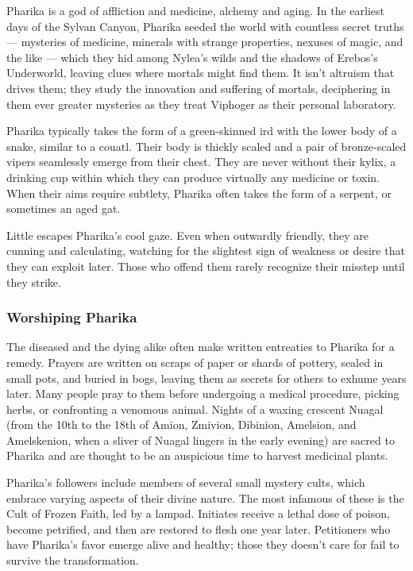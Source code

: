     Pharika is a god of affliction and medicine, alchemy and aging.
    In the earliest days of the Sylvan Canyon, Pharika seeded the world with countless secret truths --- mysteries of medicine, minerals with strange properties, nexuses of magic, and the like --- which they hid among Nylea's wilds and the shadows of Erebos's Underworld, leaving clues where mortals might find them.
    It isn't altruism that drives them; they study the innovation and suffering of mortals, deciphering in them ever greater mysteries as they treat Viphoger as their personal laboratory.

    Pharika typically takes the form of a green-skinned ird with the lower body of a snake, similar to a couatl.
    Their body is thickly scaled and a pair of bronze-scaled vipers seamlessly emerge from their chest.
    They are never without their kylix, a drinking cup within which they can produce virtually any medicine or toxin.
    When their aims require subtlety, Pharika often takes the form of a serpent, or sometimes an aged gat.

    Little escapes Pharika's cool gaze.
    Even when outwardly friendly, they are cunning and calculating, watching for the slightest sign of weakness or desire that they can exploit later.
    Those who offend them rarely recognize their misstep until they strike.

    \subsubsection{Worshiping Pharika}
        The diseased and the dying alike often make written entreaties to Pharika for a remedy.
        Prayers are written on scraps of paper or shards of pottery, sealed in small pots, and buried in bogs, leaving them as secrets for others to exhume years later.
        Many people pray to them before undergoing a medical procedure, picking herbs, or confronting a venomous animal.
        Nights of a waxing crescent Nuagal (from the 10th to the 18th of Amion, Zmivion, Dibinion, Amelsion, and Amelskenion, when a sliver of Nuagal lingers in the early evening) are sacred to Pharika and are thought to be an auspicious time to harvest medicinal plants.

        Pharika's followers include members of several small mystery cults, which embrace varying aspects of their divine nature.
        The most infamous of these is the Cult of Frozen Faith, led by a lampad.
        Initiates receive a lethal dose of poison, become petrified, and then are restored to flesh one year later.
        Petitioners who have Pharika's favor emerge alive and healthy; those they doesn't care for fail to survive the transformation.
